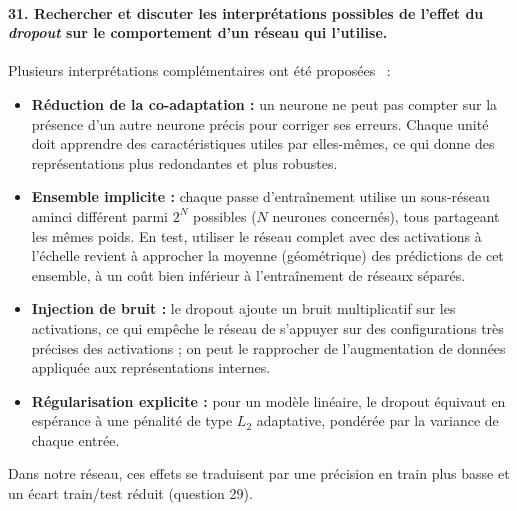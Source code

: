 \documentclass{report}
\begin{document}
\paragraph{31. Rechercher et discuter les interprétations possibles de l'effet du \textit{dropout} sur le comportement d'un réseau qui l'utilise.}
 Plusieurs interprétations complémentaires ont été proposées~\cite{srivastava2014} :
\begin{itemize}
    \item \textbf{Réduction de la co-adaptation :} un neurone ne peut pas compter sur la présence d'un autre neurone précis pour corriger ses erreurs. Chaque unité doit apprendre des caractéristiques utiles par elles-mêmes, ce qui donne des représentations plus redondantes et plus robustes.
    \item \textbf{Ensemble implicite :} chaque passe d'entraînement utilise un sous-réseau aminci différent parmi $2^N$ possibles ($N$ neurones concernés), tous partageant les mêmes poids. En test, utiliser le réseau complet avec des activations à l'échelle revient à approcher la moyenne (géométrique) des prédictions de cet ensemble, à un coût bien inférieur à l'entraînement de réseaux séparés.
    \item \textbf{Injection de bruit :} le dropout ajoute un bruit multiplicatif sur les activations, ce qui empêche le réseau de s'appuyer sur des configurations très précises des activations ; on peut le rapprocher de l'augmentation de données appliquée aux représentations internes.
    \item \textbf{Régularisation explicite :} pour un modèle linéaire, le dropout équivaut en espérance à une pénalité de type $L_2$ adaptative, pondérée par la variance de chaque entrée.
\end{itemize}
Dans notre réseau, ces effets se traduisent par une précision en train plus basse et un écart train/test réduit (question 29).
\end{document}
